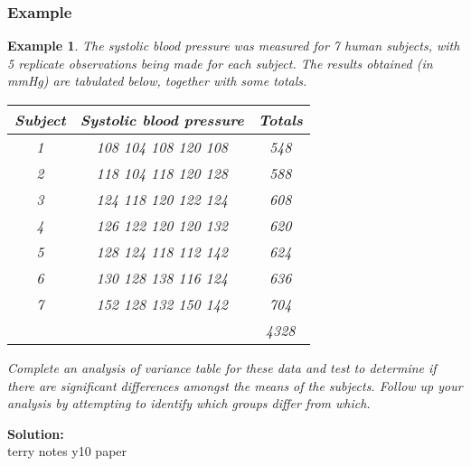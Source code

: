 \documentclass[12pt]{article}
\theoremstyle{break}
\newtheorem{example}[theorem]{Example}
\begin{document}
\subsubsection{Example}
\begin{example}
The systolic blood pressure was measured for 7 human subjects, with 5 replicate observations being made for each subject. The results obtained (in mmHg) are tabulated below, together with some totals.
\begin{center}
\begin{tabular}{|c|c|c|}
                                  \hline
                                  Subject & Systolic blood pressure & Totals \\ \hline
                                  1 & 108 104 108 120 108 & 548 \\
                                  2 & 118 104 118 120 128 & 588 \\
                                  3 & 124 118 120 122 124 & 608 \\
                                  4 & 126 122 120 120 132 & 620 \\
                                  5 & 128 124 118 112 142 & 624 \\
                                  6 & 130 128 138 116 124 & 636 \\
                                  7 & 152 128 132 150 142 & 704 \\
                                    &                     & 4328 \\
                                  \hline
                                \end{tabular}
\end{center}
Complete an analysis of variance table for these data and test to determine if there are significant differences amongst the means of the subjects. Follow up your analysis by attempting to identify which groups differ from which.
\end{example}

\begin{mdframed}
{\bf Solution:}\\
\textcolor[rgb]{1.00,1.00,1.00}{terry notes y10 paper\lipsum[1-8]}
\end{mdframed}
\end{document}

